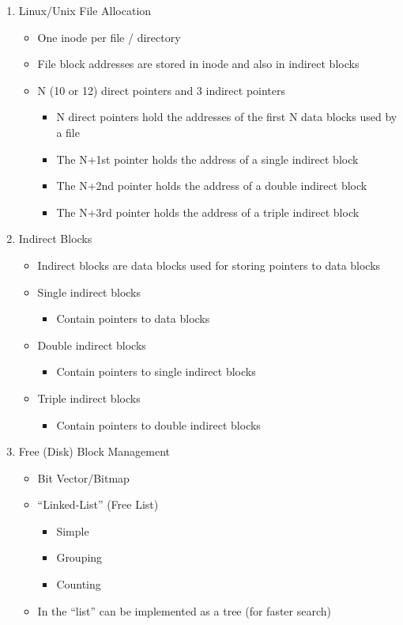 \documentclass[11pt]{article}
\begin{document}
\begin{enumerate}
\item Linux/Unix File Allocation
	\begin{itemize}
  	\item One inode per file / directory
  	\item File block addresses are stored in inode and also in indirect blocks
  	\item N (10 or 12) direct pointers and 3 indirect pointers
  		\begin{itemize}
  		\item N direct pointers hold the addresses of the first N data blocks used by a file
  		\item The N+1st pointer holds the address of a single indirect block
  		\item The N+2nd pointer holds the address of a double indirect block
  		\item The N+3rd pointer holds the address of a triple indirect block
  		\end{itemize}
  	\end{itemize}
  		
\item Indirect Blocks
	\begin{itemize}
  	\item Indirect blocks are data blocks used for storing pointers to data blocks
  	\item Single indirect blocks
  		\begin{itemize}
  		\item Contain pointers to data blocks
  		\end{itemize}
  	\item Double indirect blocks
  		\begin{itemize}
  		\item Contain pointers to single indirect blocks
  		\end{itemize}
  	\item Triple indirect blocks
  		\begin{itemize}
  		\item Contain pointers to double indirect blocks
  		\end{itemize}
  	\end{itemize}
  		
\item Free (Disk) Block Management
	\begin{itemize}
  	\item Bit Vector/Bitmap
  	\item “Linked-List” (Free List)
  		\begin{itemize}
  		\item Simple
  		\item Grouping
  		\item Counting
  		\end{itemize}
  	\item In the “list” can be implemented as a tree (for faster search)
  	\end{itemize}
  	

\end{enumerate}
\end{document}
